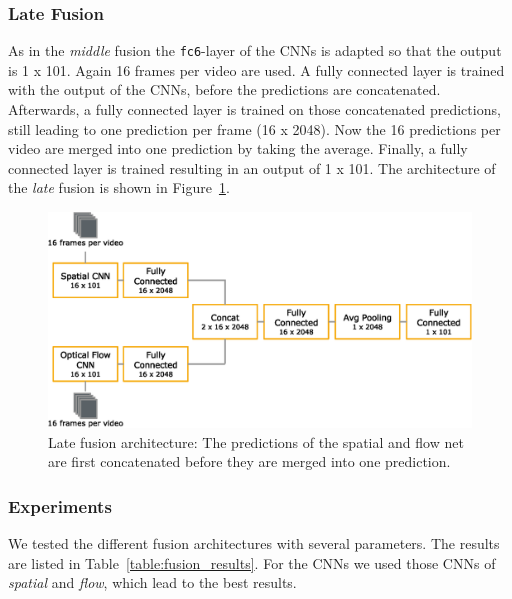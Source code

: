 \subsubsection{Late Fusion}
As in the \emph{middle} fusion the \texttt{fc6}-layer of the CNNs is adapted so that the output is 1 x 101.
Again 16 frames per video are used.
A fully connected layer is trained with the output of the CNNs, before the predictions are concatenated.
Afterwards, a fully connected layer is trained on those concatenated predictions, still leading to one prediction per frame (16 x 2048).
Now the 16 predictions per video are merged into one prediction by taking the average.
Finally, a fully connected layer is trained resulting in an output of 1 x 101.
The architecture of the \emph{late} fusion is shown in Figure~\ref{fig:late_fusion}.

\begin{figure}[!htb]
	\centering
	\includegraphics[scale=.7]{images/late_fusion.eps}
	\caption{Late fusion architecture: The predictions of the spatial and flow net are first concatenated before they are merged into one prediction.}
	\label{fig:late_fusion}
\end{figure}

\subsubsection{Experiments}

We tested the different fusion architectures with several parameters.
The results are listed in Table~\ref{table:fusion_results}.
For the CNNs we used those CNNs of \emph{spatial} and \emph{flow}, which lead to the best results.

